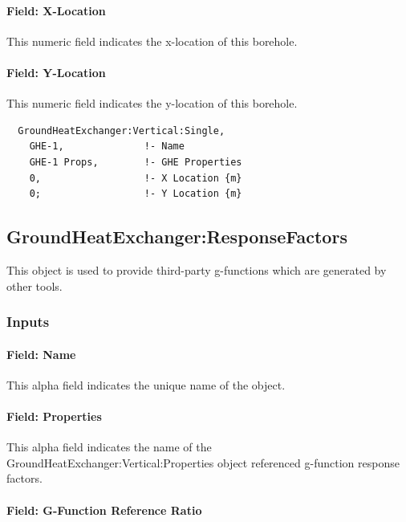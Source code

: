 \paragraph{Field: X-Location}

This numeric field indicates the x-location of this borehole.

\paragraph{Field: Y-Location}

This numeric field indicates the y-location of this borehole.

\begin{lstlisting}
  GroundHeatExchanger:Vertical:Single,
    GHE-1,              !- Name
    GHE-1 Props,        !- GHE Properties
    0,                  !- X Location {m}
    0;                  !- Y Location {m}
\end{lstlisting}

\subsection{GroundHeatExchanger:ResponseFactors}\label{groundheatexchangerresponsefactors}

This object is used to provide third-party g-functions which are generated by other tools.

\subsubsection{Inputs}

\paragraph{Field: Name}

This alpha field indicates the unique name of the object.

\paragraph{Field: Properties}

This alpha field indicates the name of the GroundHeatExchanger:Vertical:Properties object referenced g-function response factors.

\paragraph{Field: G-Function Reference Ratio}\label{field-g-function-reference-ratio}

